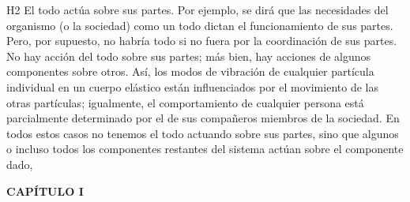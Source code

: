{H2 El todo actúa sobre sus partes. Por ejemplo, se dirá que las necesidades del organismo (o la sociedad) como un todo dictan el funcionamiento de sus partes. 
Pero, por supuesto, no habría todo si no fuera por la coordinación de sus partes. No hay acción del todo sobre sus partes; más bien, hay acciones de algunos componentes sobre otros. 
Así, los modos de vibración de cualquier partícula individual en un cuerpo elástico están influenciados por el movimiento de las otras partículas; igualmente, el comportamiento de cualquier persona está parcialmente determinado por el de sus compañeros miembros de la sociedad. 
En todos estos casos no tenemos el todo actuando sobre sus partes, sino que algunos o incluso todos los componentes restantes del sistema actúan sobre el componente dado,
}

\newpage
\fancyhf{}
\fancyhead[l]{\thepage}
\begin{center}
{\fontsize{13}{16}\selectfont \textbf{CAPÍTULO I}}
\end{center}
\vspace{0.5cm}

